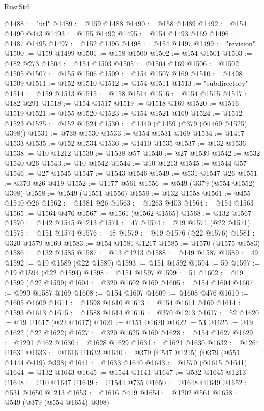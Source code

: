 \begin{lexlean}{RustStd}
\begin{coremodule}
@1488 := "url"
@1489 := @159 @1488
@1490 := @158 @1489
@1492 := @154 @1490 @443
@1493 := @155 @1492
@1495 := @154 @1493 @169
@1496 := @1487 @1495
@1497 := @152 @1496
@1498 := @154 @1497
@1499 := "revision"
@1500 := @159 @1499
@1501 := @158 @1500
@1502 := @154 @1501
@1503 := @182 @273
@1504 := @154 @1503
@1505 := @1504 @169
@1506 := @1502 @1505
@1507 := @155 @1506
@1509 := @154 @1507 @169
@1510 := @1498 @1509
@1511 := @152 @1510
@1512 := @154 @1511
@1513 := "subdirectory"
@1514 := @159 @1513
@1515 := @158 @1514
@1516 := @154 @1515
@1517 := @182 @291
@1518 := @154 @1517
@1519 := @1518 @169
@1520 := @1516 @1519
@1521 := @155 @1520
@1523 := @154 @1521 @169
@1524 := @1512 @1523
@1525 := @152 @1524
@1530 := @1440 (@1459 (@379 (@1469 @1525) @398))
@1531 := @738 @1530
@1533 := @154 @1531 @169
@1534 := @1417 @1533
@1535 := @152 @1534
@1536 := @1410 @1535
@1537 := @132 @1536
@1538 := @10 @1212
@1539 := @1538 @57
@1540 := @27 @1539
@1542 := @532 @1540 @26
@1543 := @10 @1542
@1544 := @10 @1213
@1545 := @1544 @57
@1546 := @27 @1545
@1547 := @1543 @1546
@1549 := @531 @1547 @26
@1551 := @370 @26 @419
@1552 := @1177 @561
@1556 := @549 (@379 (@554 @1552) @398)
@1558 := @1549 (@1551 @1556)
@1559 := @132 @1558
@1561 := @455 @1540 @26
@1562 := @1381 @26
@1563 := @1263 @403
@1564 := @154 @1563
@1565 := @1564 @476
@1567 := @1561 (@1562 @1565)
@1568 := @132 @1567
@1570 := @142 @1545 @1213
@1571 := 47
@1574 := @19 @1571 (@22 @1571)
@1575 := @151 @1574
@1576 := 48
@1579 := @19 @1576 (@22 @1576)
@1581 := @320 @1579 @169
@1583 := @154 @1581 @1217
@1585 := @1570 (@1575 @1583)
@1586 := @132 @1585
@1587 := @13 @1213
@1588 := @149 @1587
@1589 := 49
@1592 := @19 @1589 (@22 @1589)
@1593 := @151 @1592
@1594 := 50
@1597 := @19 @1594 (@22 @1594)
@1598 := @151 @1597
@1599 := 51
@1602 := @19 @1599 (@22 @1599)
@1604 := @320 @1602 @169
@1605 := @154 @1604
@1607 := @999 @1587 @169
@1608 := @154 @1607
@1609 := @1608 @476
@1610 := @1605 @1609
@1611 := @1598 @1610
@1613 := @154 @1611 @169
@1614 := @1593 @1613
@1615 := @1588 @1614
@1616 := @370 @1213
@1617 := 52
@1620 := @19 @1617 (@22 @1617)
@1621 := @151 @1620
@1622 := 53
@1625 := @19 @1622 (@22 @1622)
@1627 := @320 @1625 @169
@1628 := @154 @1627
@1629 := @1291 @462
@1630 := @1628 @1629
@1631 := @1621 @1630
@1632 := @1264 @1631
@1633 := @1616 @1632
@1640 := @379 (@547 @1215) (@379 (@551 @1444 @419) @398)
@1641 := @1633 @1640
@1643 := @1570 (@1615 @1641)
@1644 := @132 @1643
@1645 := @1544 @1141
@1647 := @532 @1645 @1213
@1648 := @10 @1647
@1649 := @1544 @735
@1650 := @1648 @1649
@1652 := @531 @1650 @1213
@1653 := @1616 @419
@1654 := @1202 @561
@1658 := @549 (@379 (@554 @1654) @398)

\end{coremodule}
\end{lexlean}
